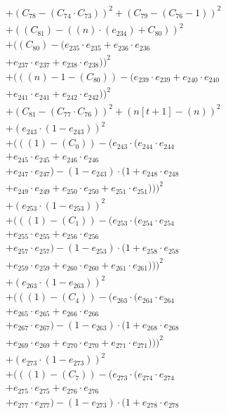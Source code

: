 \documentclass[10pt, a4paper]{article}
\begin{document}
\begin{small}
\begin{align*}
& + (C_{78} - (C_{74}  \cdot  C_{73}))^{2} + (C_{79} - (C_{76} - 1))^{2} \\
& + ((C_{81}) - ((n)  \cdot  (e_{234}) + C_{80}))^{2} \\
& + ((C_{80}) - (e_{235} \cdot e_{235} + e_{236} \cdot e_{236} \\
& + e_{237} \cdot e_{237} + e_{238} \cdot e_{238}))^{2} \\
& + (((n) - 1 - (C_{80})) - (e_{239} \cdot e_{239} + e_{240} \cdot e_{240} \\
& + e_{241} \cdot e_{241} + e_{242} \cdot e_{242}))^{2} \\
& + (C_{81} - (C_{77}  \cdot  C_{76}))^{2} + (n[t+1] - (n))^{2} \\
& + (e_{243} \cdot (1 - e_{243}))^{2} \\
& + (((1) - (C_{0})) - (e_{243} \cdot (e_{244} \cdot e_{244} \\
& + e_{245} \cdot e_{245} + e_{246} \cdot e_{246} \\
& + e_{247} \cdot e_{247}) - (1 - e_{243}) \cdot (1 + e_{248} \cdot e_{248} \\
& + e_{249} \cdot e_{249} + e_{250} \cdot e_{250} + e_{251} \cdot e_{251})))^{2} \\
& + (e_{253} \cdot (1 - e_{253}))^{2} \\
& + (((1) - (C_{1})) - (e_{253} \cdot (e_{254} \cdot e_{254} \\
& + e_{255} \cdot e_{255} + e_{256} \cdot e_{256} \\
& + e_{257} \cdot e_{257}) - (1 - e_{253}) \cdot (1 + e_{258} \cdot e_{258} \\
& + e_{259} \cdot e_{259} + e_{260} \cdot e_{260} + e_{261} \cdot e_{261})))^{2} \\
& + (e_{263} \cdot (1 - e_{263}))^{2} \\
& + (((1) - (C_{4})) - (e_{263} \cdot (e_{264} \cdot e_{264} \\
& + e_{265} \cdot e_{265} + e_{266} \cdot e_{266} \\
& + e_{267} \cdot e_{267}) - (1 - e_{263}) \cdot (1 + e_{268} \cdot e_{268} \\
& + e_{269} \cdot e_{269} + e_{270} \cdot e_{270} + e_{271} \cdot e_{271})))^{2} \\
& + (e_{273} \cdot (1 - e_{273}))^{2} \\
& + (((1) - (C_{7})) - (e_{273} \cdot (e_{274} \cdot e_{274} \\
& + e_{275} \cdot e_{275} + e_{276} \cdot e_{276} \\
& + e_{277} \cdot e_{277}) - (1 - e_{273}) \cdot (1 + e_{278} \cdot e_{278} \\

\end{align*}
\end{small}
\end{document}
